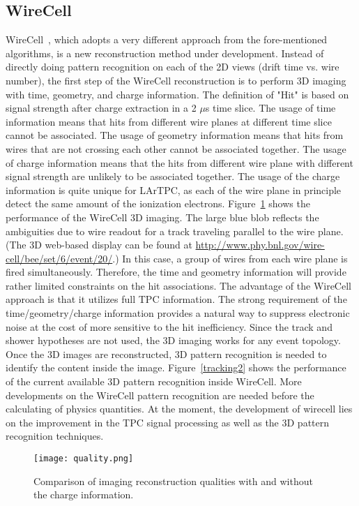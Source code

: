 \subsection{WireCell}
WireCell~\cite{wirecell}, which adopts a very different approach from the 
fore-mentioned algorithms, is a new reconstruction method under development.
Instead of directly doing pattern recognition on each of the 2D views (drift 
time vs. wire number), the first step of the WireCell reconstruction is to 
perform 3D imaging with time, geometry, and charge information. The definition
of "Hit" is based on signal strength after charge extraction in a 2 $\mu$s time slice. The usage of 
time information means that hits from different wire planes at different time 
slice cannot be associated. The usage of geometry information means that hits
from wires that are not crossing each other cannot be associated together. 
The usage of charge information means that the hits from different wire plane
with different signal strength are unlikely to be associated together. The 
usage of the charge information is quite unique for LArTPC, as each of the 
wire plane in principle detect the same amount of the ionization electrons. 
Figure~\ref{quality} shows the performance of the WireCell 3D imaging. 
The large blue blob reflects the ambiguities due to wire readout for a track
traveling parallel to the wire plane. (The 3D web-based 
display can be found at 
\url{http://www.phy.bnl.gov/wire-cell/bee/set/6/event/20/}.) In this case, a group of wires from each 
wire plane is fired simultaneously. Therefore, the time and geometry 
information will provide rather limited constraints on the hit associations. 
The advantage of the WireCell approach is that it utilizes full TPC 
information. The strong requirement of the time/geometry/charge information
provides a natural way to suppress electronic noise at the cost of more
sensitive to the hit inefficiency. Since the track and shower hypotheses
are not used, the 3D imaging works for any event topology. Once the 3D
images are reconstructed, 3D pattern recognition is needed to identify 
the content inside the image. Figure~\ref{tracking2} shows the 
performance of the current available 3D pattern recognition inside
WireCell. More developments on the WireCell pattern recognition 
are needed before the calculating of physics quantities. At the moment, the 
development of wirecell lies on the improvement in the TPC signal 
processing as well as the 3D pattern recognition techniques.


\begin{figure}[!ht]
\texttt{[image: quality.png]}
\caption[Comparison of imaging recon
qualities with and without charge information]{Comparison of imaging reconstruction 
qualities with and without the charge information. }
\label{quality}
\end{figure}


